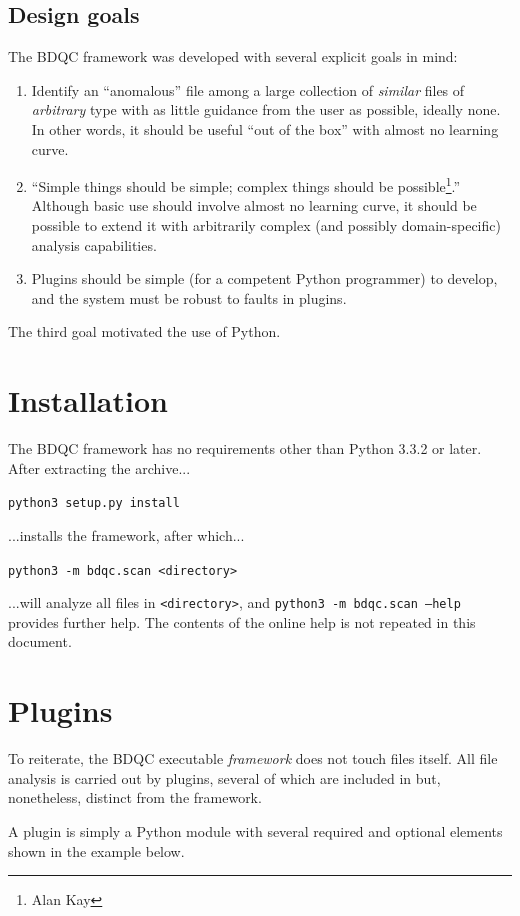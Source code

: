 \documentclass {article}
\begin{document}
\subsection{Design goals}
The BDQC framework was developed with several explicit goals in mind:
\begin{enumerate}
\item Identify an ``anomalous'' file among a large collection of
	\emph{similar} files of \emph{arbitrary} type
	with as little guidance from the user as possible, ideally none.
	In other words, it should be useful ``out of the box'' with almost no
	learning curve.
\item ``Simple things should be simple; complex things should be
	possible\footnote{Alan Kay}.''
	Although basic use should involve almost no learning curve, it should
	be possible to extend it with arbitrarily complex (and possibly
	domain-specific) analysis capabilities.
\item Plugins should be simple (for a competent Python programmer) to
	develop, and the system must be robust to faults in plugins.
\end{enumerate}

The third goal motivated the use of Python.

\section{Installation}

The BDQC framework has no requirements other than Python 3.3.2 or later.
After extracting the archive...

{\tt python3 setup.py install}

...installs the framework, after which...

{\tt python3 -m bdqc.scan <directory> }

...will analyze all files in {\tt <directory>}, and
{\tt python3 -m bdqc.scan --help} provides further help.
The contents of the online help is not repeated in this document.


\newpage
\section{Plugins}
To reiterate, the BDQC executable \emph{framework} does not touch
files itself. All file analysis is carried out by plugins,
several of which are included in but, nonetheless, distinct from the
framework. 

A plugin is simply a Python module with several required and optional
elements shown in the example below.
\end{document}
